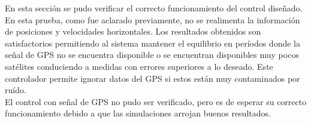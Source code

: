\documentclass[main]{subfiles}
\begin{document}
En esta secci\'on se pudo verificar el correcto funcionamiento del control diseñado. En esta prueba, como fue aclarado previamente, no se realimenta la informaci\'on de posiciones y velocidades horizontales. Los resultados obtenidos son satisfactorios permitiendo al sistema mantener el equilibrio en per\'iodos donde la señal de GPS no se encuentra disponible o se encuentran disponibles muy pocos sat\'elites conduciendo a medidas con errores superiores a lo deseado. Este controlador permite ignorar datos del GPS si estos est\'an muy contaminados por ru\'ido.\\

El control con señal de GPS no pudo ser verificado, pero es de esperar su correcto funcionamiento debido a que las simulaciones arrojan buenos resultados.
\end{document}
